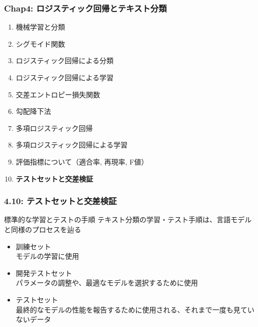 \documentclass[unicode,11pt]{beamer} %
\begin{document}
\begin{frame}
    \frametitle{Chap4: ロジスティック回帰とテキスト分類}
    \begin{block}{}
        \begin{enumerate}
            \item 機械学習と分類
            \item シグモイド関数
            \item ロジスティック回帰による分類
            \item ロジスティック回帰による学習
            \item 交差エントロピー損失関数
            \item 勾配降下法
            \item 多項ロジスティック回帰
            \item 多項ロジスティック回帰による学習
            \item 評価指標について（適合率, 再現率, F値）
            \item {\color{red}\textbf{テストセットと交差検証}}
        \end{enumerate}
    \end{block}
\end{frame}

\begin{frame}
    \frametitle{4.10: テストセットと交差検証}
    \begin{alertblock}{標準的な学習とテストの手順}
        テキスト分類の学習・テスト手順は、言語モデルと同様のプロセスを辿る
        \begin{itemize}
            \item 訓練セット\\モデルの学習に使用
            \item 開発テストセット\\パラメータの調整や、最適なモデルを選択するために使用
            \item テストセット\\最終的なモデルの性能を報告するために使用される、それまで一度も見ていないデータ
        \end{itemize}
    \end{alertblock}
\end{frame}
\end{document}
